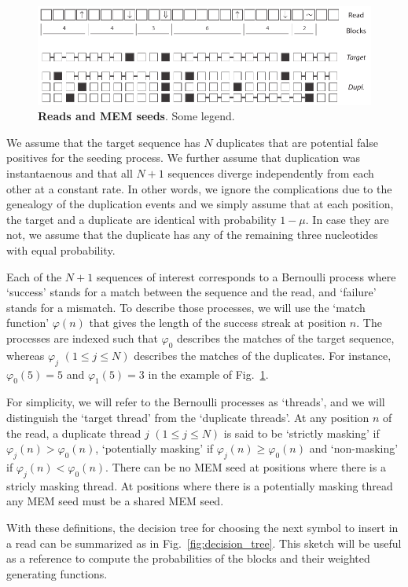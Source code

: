 \documentclass{article}
\begin{document}
\begin{figure}[h]
\centering
\includegraphics[scale=.9]{sketch_MEM.pdf}
\caption{\textbf{Reads and MEM seeds}. 
Some legend.}
\label{fig:sketch_MEM}
\end{figure}


We assume that the target sequence has $N$ duplicates that are potential
false positives for the seeding process. We further assume that
duplication was instantaenous and that all $N+1$ sequences diverge
independently from each other at a constant rate. In other words, we
ignore the complications due to the genealogy of the duplication events
and we simply assume that at each position, the target and a duplicate are
identical with probability $1-\mu$. In case they are not, we assume that
the duplicate has any of the remaining three nucleotides with equal
probability.

Each of the $N+1$ sequences of interest corresponds to a Bernoulli process
where `success' stands for a match between the sequence and the read, and
`failure' stands for a mismatch. To describe those processes, we will use
the `match function' $\varphi(n)$ that gives the length of the success
streak at position $n$. The processes are indexed such that $\varphi_0$
describes the matches of the target sequence, whereas $\varphi_j$ $(1 \leq
j \leq N)$ describes the matches of the duplicates. For instance,
$\varphi_0(5) = 5$ and $\varphi_1(5) = 3$ in the example of
Fig.~\ref{fig:sketch_MEM}.

For simplicity, we will refer to the Bernoulli processes as `threads', and
we will distinguish the `target thread' from the `duplicate threads'. At
any position $n$ of the read, a duplicate thread $j$ $(1 \leq j \leq N)$
is said to be `strictly masking' if $\varphi_j(n) > \varphi_0(n)$,
`potentially masking' if $\varphi_j(n) \geq \varphi_0(n)$ and
`non-masking' if $\varphi_j(n) < \varphi_0(n)$. There can be no MEM seed
at positions where there is a stricly masking thread. At positions where
there is a potentially masking thread any MEM seed must be a shared MEM
seed.


With these definitions, the decision tree for choosing the next symbol to
insert in a read can be summarized as in Fig.~\ref{fig:decision_tree}.
This sketch will be useful as a reference to compute the probabilities of
the blocks and their weighted generating functions.
\end{document}
